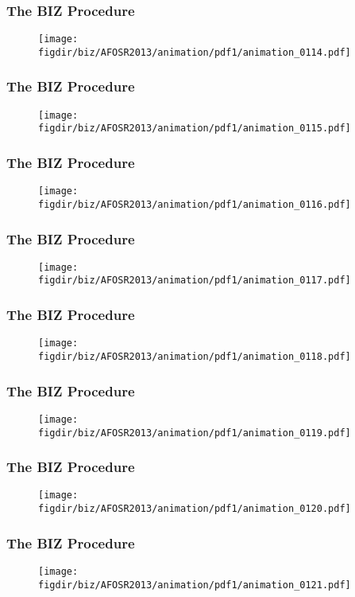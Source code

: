 \documentclass[13pt]{beamer}
\newcommand{\figdir}{../../fig}
\begin{document}
\begin{frame}\frametitle{The BIZ Procedure}\begin{figure}\texttt{[image: \\figdir/biz/AFOSR2013/animation/pdf1/animation\_0114.pdf]}\end{figure}\end{frame}
\begin{frame}\frametitle{The BIZ Procedure}\begin{figure}\texttt{[image: \\figdir/biz/AFOSR2013/animation/pdf1/animation\_0115.pdf]}\end{figure}\end{frame}
\begin{frame}\frametitle{The BIZ Procedure}\begin{figure}\texttt{[image: \\figdir/biz/AFOSR2013/animation/pdf1/animation\_0116.pdf]}\end{figure}\end{frame}
\begin{frame}\frametitle{The BIZ Procedure}\begin{figure}\texttt{[image: \\figdir/biz/AFOSR2013/animation/pdf1/animation\_0117.pdf]}\end{figure}\end{frame}
\begin{frame}\frametitle{The BIZ Procedure}\begin{figure}\texttt{[image: \\figdir/biz/AFOSR2013/animation/pdf1/animation\_0118.pdf]}\end{figure}\end{frame}
\begin{frame}\frametitle{The BIZ Procedure}\begin{figure}\texttt{[image: \\figdir/biz/AFOSR2013/animation/pdf1/animation\_0119.pdf]}\end{figure}\end{frame}
\begin{frame}\frametitle{The BIZ Procedure}\begin{figure}\texttt{[image: \\figdir/biz/AFOSR2013/animation/pdf1/animation\_0120.pdf]}\end{figure}\end{frame}
\begin{frame}\frametitle{The BIZ Procedure}\begin{figure}\texttt{[image: \\figdir/biz/AFOSR2013/animation/pdf1/animation\_0121.pdf]}\end{figure}\end{frame}
\end{document}
